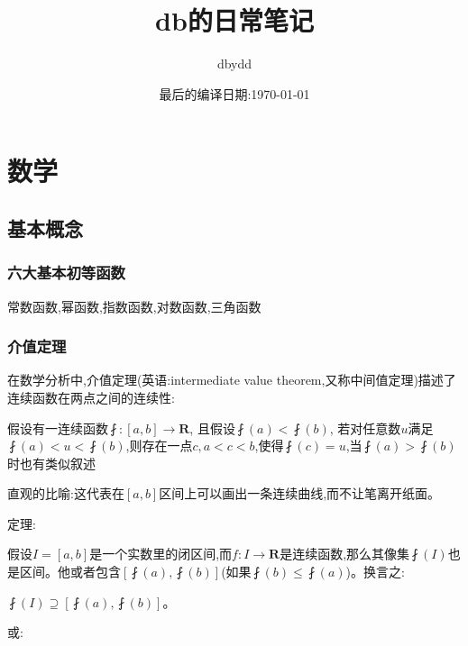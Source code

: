 \documentclass[UTF8]{ctexbook}
\title{db的日常笔记}
\date{最后的编译日期:\today}
\author{dbydd}
\begin{document}
\setcounter{page}{1}
\chapter{数学}{
\section{基本概念}{
\subsection{六大基本初等函数}{
  常数函数,幂函数,指数函数,对数函数,三角函数
}%

\subsection{介值定理}{
在数学分析中,介值定理(英语:intermediate value theorem,又称中间值定理)描述了连续函数在两点之间的连续性:

假设有一连续函数$\fint:[a,b]\rightarrow \mathbf{R}$, 且假设$\fint(a)<\fint(b)$, 若对任意数$u$满足$\fint(a)<u<\fint(b)$,则存在一点$c,a<c<b$,使得$\fint(c) = u$,当$\fint(a)>\fint(b)$时也有类似叙述

直观的比喻:这代表在$[a,b]$区间上可以画出一条连续曲线,而不让笔离开纸面。
\newline

定理:

假设$I = [a,b]$是一个实数里的闭区间,而$f:I\rightarrow\mathbf{R}$是连续函数,那么其像集$\fint(I)$也是区间。他或者包含$[\fint(a),\fint(b)]$(如果$\fint(b)\leq\fint(a)$)。换言之:

$\fint(I)\supseteq[\fint(a),\fint(b)]$。

或:

}}}
\end{document}
